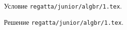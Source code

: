 Условие \texttt{regatta/junior/algbr/1.tex}.

\solution Решение \texttt{regatta/junior/algbr/1.tex}.
